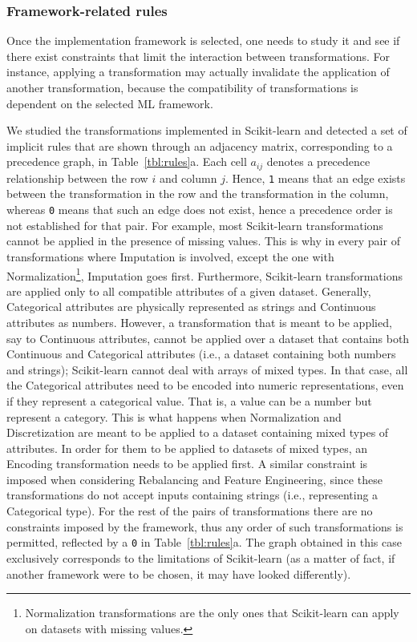 \subsubsection{Framework-related rules}
\label{ssec:rules-framework}
Once the implementation framework is selected, one needs to study it and see if there exist constraints that limit the interaction between transformations. For instance, applying a transformation may actually invalidate the application of another transformation, because the compatibility of transformations is dependent on the selected ML framework.

\begin{example}
We studied the transformations implemented in Scikit-learn and detected a set of implicit rules that are shown through an adjacency matrix, corresponding to a precedence graph, in Table~\ref{tbl:rules}a.
Each cell $a_{ij}$ denotes a precedence relationship between the row $i$ and column $j$. Hence, \texttt{1} means that an edge exists between the transformation in the row and the transformation in the column, whereas \texttt{0} means that such an edge does not exist, hence a precedence order is not established for that pair. 
For example, most Scikit-learn transformations cannot be applied in the presence of missing values. This is why in every pair of transformations where Imputation is involved, except the one with Normalization\footnote{Normalization transformations are the only ones that Scikit-learn can apply on datasets with missing values.}, Imputation goes first.
Furthermore, Scikit-learn transformations are applied only to all compatible attributes of a given dataset. Generally, Categorical attributes are physically represented as strings and Continuous attributes as numbers. However, a transformation that is meant to be applied, say to Continuous attributes, cannot be applied over a dataset that contains both Continuous and Categorical attributes (i.e., a dataset containing both numbers and strings); Scikit-learn cannot deal with arrays of mixed types. In that case, all the Categorical attributes need to be encoded into numeric representations, even if they represent a categorical value. That is, a value can be a number but represent a category. 
This is what happens when Normalization and Discretization are meant to be applied to a dataset containing mixed types of attributes. In order for them to be applied to datasets of mixed types, an Encoding transformation needs to be applied first. A similar constraint is imposed when considering Rebalancing and Feature Engineering, since these transformations do not accept inputs containing strings (i.e., representing a Categorical type). 
For the rest of the pairs of transformations there are no constraints imposed by the framework, thus any order of such transformations is permitted, reflected by a \texttt{0} in Table~\ref{tbl:rules}a.
The graph obtained in this case exclusively corresponds to the limitations of Scikit-learn (as a matter of fact, if another framework were to be chosen, it may have looked differently).
\end{example}

